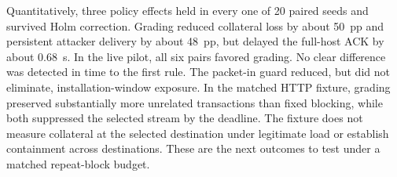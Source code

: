 \documentclass[conference]{IEEEtran}
\begin{document}
Quantitatively, three policy effects held in every one of 20 paired seeds and
survived Holm correction. Grading reduced collateral loss by about 50~pp and
persistent attacker delivery by about 48~pp, but delayed the full-host ACK by about
0.68~s. In the live pilot, all six pairs favored grading. No clear difference was
detected in time to the first rule. The packet-in guard reduced, but did not
eliminate, installation-window exposure. In the matched HTTP fixture,
grading preserved substantially more unrelated transactions than fixed
blocking, while both suppressed the selected stream by the deadline.
The fixture does not measure collateral
at the selected destination under legitimate load or establish containment
across destinations. These are the next outcomes to test under a matched
repeat-block budget.

\appendices


\clearpage
\balance


\end{document}
